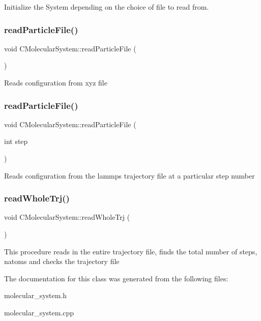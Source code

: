 Initialize the System depending on the choice of file to read from. \mbox{\label{classCMolecularSystem_a019709e83f903659bdb82c226da4189a}} 
\subsubsection{\texorpdfstring{read\+Particle\+File()}{readParticleFile()}\hspace{0.1cm}{\footnotesize\ttfamily [1/2]}}
{\footnotesize\ttfamily void C\+Molecular\+System\+::read\+Particle\+File (\begin{DoxyParamCaption}{ }\end{DoxyParamCaption})}

Reads configuration from xyz file \mbox{\label{classCMolecularSystem_a7ccd08c6a0182faf0316d9f1f8ec1651}} 
\subsubsection{\texorpdfstring{read\+Particle\+File()}{readParticleFile()}\hspace{0.1cm}{\footnotesize\ttfamily [2/2]}}
{\footnotesize\ttfamily void C\+Molecular\+System\+::read\+Particle\+File (\begin{DoxyParamCaption}\item[{int}]{step }\end{DoxyParamCaption})}

Reads configuration from the lammps trajectory file at a particular step number \mbox{\label{classCMolecularSystem_a68c2be35fb9f9dbd1915ddf1c845eb15}} 
\subsubsection{\texorpdfstring{read\+Whole\+Trj()}{readWholeTrj()}}
{\footnotesize\ttfamily void C\+Molecular\+System\+::read\+Whole\+Trj (\begin{DoxyParamCaption}{ }\end{DoxyParamCaption})}

This procedure reads in the entire trajectory file, finds the total number of steps, natoms and checks the trajectory file 

The documentation for this class was generated from the following files\+:\begin{DoxyCompactItemize}
\item 
molecular\+\_\+system.\+h\item 
molecular\+\_\+system.\+cpp\end{DoxyCompactItemize}
